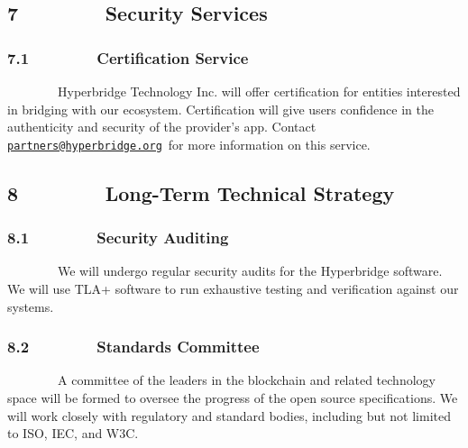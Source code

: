 \documentclass[]{article}
\begin{document}
\hypertarget{h.bzvzzht64u2y}{%
\subsection{\texorpdfstring{{7~~~~~~~~Security
Services}}{7~~~~~~~~Security Services}}\label{h.bzvzzht64u2y}}

\hypertarget{h.abkm0ffjqjrl}{%
\subsubsection{\texorpdfstring{{7.1~~~~~~~~Certification
Service}}{7.1~~~~~~~~Certification Service}}\label{h.abkm0ffjqjrl}}

{~~~~~~~~Hyperbridge Technology Inc. will offer certification for
entities interested in bridging with our ecosystem. Certification will
give users confidence in the authenticity and security of the provider's
app. Contact
}{\href{mailto:partners@hyperbridge.org}{\nolinkurl{partners@hyperbridge.org}}}{~for
more information on this service.}

{}

\hypertarget{h.ene1l8rtlw39}{%
\subsection{\texorpdfstring{{8~~~~~~~~Long-Term Technical
Strategy}}{8~~~~~~~~Long-Term Technical Strategy}}\label{h.ene1l8rtlw39}}

\hypertarget{h.qtopow1tsp61}{%
\subsubsection{\texorpdfstring{{8.1~~~~~~~~Security
Auditing}}{8.1~~~~~~~~Security Auditing}}\label{h.qtopow1tsp61}}

{~~~~~~~~We will undergo regular security audits for the Hyperbridge
software. We will use TLA+ software to run exhaustive testing and
verification against our systems. }

\hypertarget{h.t07ugrvxhyau}{%
\subsubsection{\texorpdfstring{{8.2~~~~~~~~Standards
Committee}}{8.2~~~~~~~~Standards Committee}}\label{h.t07ugrvxhyau}}

{~~~~~~~~A committee of the leaders in the blockchain and related
technology space will be formed to oversee the progress of the open
source specifications. We will work closely with regulatory and standard
bodies, including but not limited to ISO, IEC, and W3C.}
\end{document}
